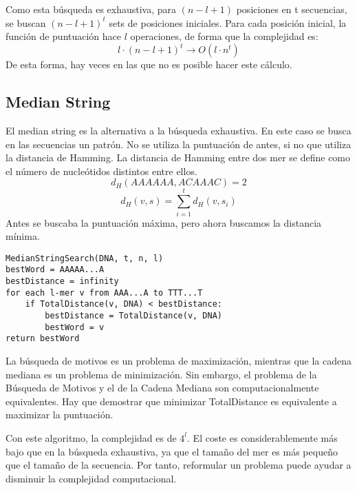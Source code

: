 Como esta búsqueda es exhaustiva, para $(n - l + 1)$ posiciones en t secuencias, se buscan $(n - l + 1)^t$ sets de posiciones iniciales. Para cada posición inicial, la función de puntuación hace $l$ operaciones, de forma que la complejidad es:
$$l \cdot (n - l + 1)^t \rightarrow O(l \cdot n^t)$$
De esta forma, hay veces en las que no es posible hacer este cálculo.

\subsection{Median String}
El median string es la alternativa a la búsqueda exhaustiva. En este caso se busca en las secuencias un patrón. No se utiliza la puntuación de antes, si no que utiliza la distancia de Hamming. La distancia de Hamming entre dos mer se define como el número de nucleótidos distintos entre ellos. 
$$d_H(AAAAAA, ACAAAC) = 2$$
$$d_H(v, s) = \sum^t_{i = 1} d_H(v, s_i)$$
Antes se buscaba la puntuación máxima, pero ahora buscamos la distancia mínima. 

\begin{lstlisting}
MedianStringSearch(DNA, t, n, l)
bestWord = AAAAA...A
bestDistance = infinity
for each l-mer v from AAA...A to TTT...T
	if TotalDistance(v, DNA) < bestDistance:
		bestDistance = TotalDistance(v, DNA)
		bestWord = v
return bestWord
\end{lstlisting}

La búsqueda de motivos es un problema de maximización, mientras que la cadena mediana es un problema de minimización. Sin embargo, el problema de la Búsqueda de Motivos y el de la Cadena Mediana son computacionalmente equivalentes. Hay que demostrar que minimizar TotalDistance es equivalente a maximizar la puntuación.

Con este algoritmo, la complejidad es de $4^l$. El coste es considerablemente más bajo que en la búsqueda exhaustiva, ya que el tamaño del mer es más pequeño que el tamaño de la secuencia. Por tanto, reformular un problema puede ayudar a disminuir la complejidad computacional. 

